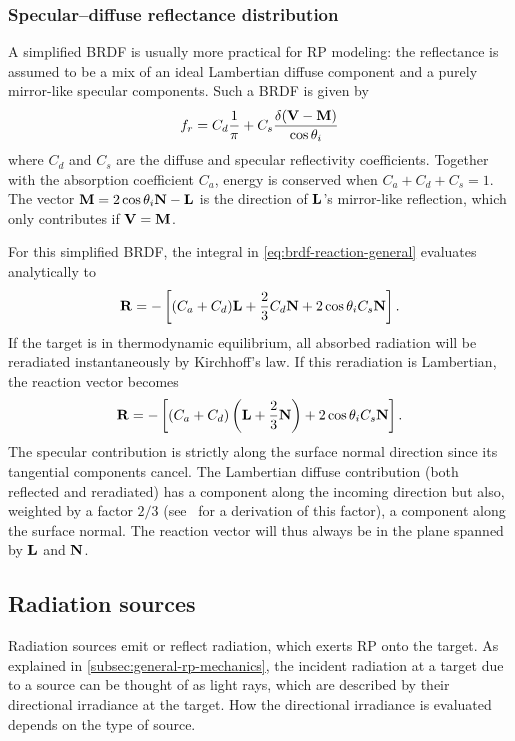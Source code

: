 \subsubsection{Specular--diffuse reflectance distribution}
A simplified \gls{BRDF} is usually more practical for \gls{RP} modeling: the reflectance is assumed to be a mix of an ideal Lambertian diffuse component and a purely mirror-like specular components. Such a \gls{BRDF} is given by~\cite{Wetterer2014}
\begin{align}
    \label{eq:brdf-specular-diffuse}
    f_r = C_d \frac{1}{\pi} + C_s \frac{\delta(\vb V - \vb M)}{\cos \theta_i}
\end{align}
where $C_d$ and $C_s$ are the diffuse and specular reflectivity coefficients. Together with the absorption coefficient $C_a$, energy is conserved when $C_a + C_d + C_s = 1$. The vector $\vb M = 2\cos\theta_i\vb N - \vb L$ is the direction of $\vb L$'s mirror-like reflection, which only contributes if $\vb V = \vb M$.

For this simplified \gls{BRDF}, the integral in \cref{eq:brdf-reaction-general} evaluates analytically to~\cite{Montenbruck2014}
\begin{align}
    \vb R = - \left[ (C_a + C_d) \vb L + \frac{2}{3} C_d \vb N + 2 \cos\theta_i C_s \vb N \right].
\end{align}
If the target is in thermodynamic equilibrium, all absorbed radiation will be reradiated instantaneously by Kirchhoff's law. If this reradiation is Lambertian, the reaction vector becomes~\cite{Montenbruck2014}
\begin{align}
    \vb R = - \left[ (C_a + C_d) \left(\vb L + \frac{2}{3} \vb N\right) + 2 \cos\theta_i C_s \vb N \right].
\end{align}
The specular contribution is strictly along the surface normal direction since its tangential components cancel. The Lambertian diffuse contribution (both reflected and reradiated) has a component along the incoming direction but also, weighted by a factor $2/3$ (see~\cite{Ziebart2004} for a derivation of this factor), a component along the surface normal. The reaction vector will thus always be in the plane spanned by $\vb L$ and $\vb N$.



\subsection{Radiation sources}
Radiation sources emit or reflect radiation, which exerts \gls{RP} onto the target. As explained in \cref{subsec:general-rp-mechanics}, the incident radiation at a target due to a source can be thought of as light rays, which are described by their directional irradiance at the target. How the directional irradiance is evaluated depends on the type of source.

